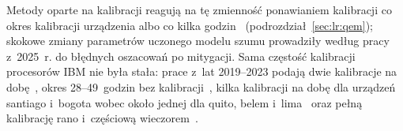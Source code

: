 Metody oparte na kalibracji reagują na tę zmienność ponawianiem kalibracji co okres kalibracji urządzenia albo co kilka godzin~\cite{maciejewski_mitigation_2020,van_den_berg_probabilistic_2023} (podrozdział~\ref{sec:lr:qem}); skokowe zmiany parametrów uczonego modelu szumu prowadziły według pracy~\cite{kim_error_2025} z~2025~r. do błędnych oszacowań po mitygacji.
Sama częstość kalibracji procesorów IBM nie była stała: prace z~lat 2019--2023 podają dwie kalibracje na dobę~\cite{murali_noise-adaptive_2019}, okres 28--49~godzin bez kalibracji~\cite{wilson_just-in-time_2020}, kilka kalibracji na dobę dla urządzeń santiago i~bogota wobec około jednej dla quito, belem i~lima~\cite{etxezarreta_multiqubit_2023} oraz pełną kalibrację rano i~częściową wieczorem~\cite{yeter-aydeniz_measuring_2023}.

